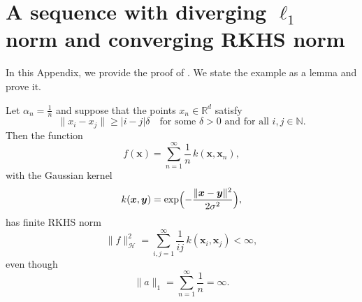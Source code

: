 \section{A sequence with diverging $\ell_1$ norm and converging RKHS norm}\label{app: diverging}
In this Appendix, we provide the proof of . We state the example as a lemma and prove it.

\begin{lemma}
Let $\alpha_n = \frac{1}{n}$ and suppose that the points $x_n \in \mathbb{R}^d$ satisfy 
\[
\|x_i-x_j\| \ge |i-j|\delta \quad \text{for some } \delta>0 \text{ and for all } i,j \in \mathbb{N}.
\]
Then the function
\[
f(\bm{x})=\sum_{n=1}^\infty \frac{1}{n}\, k(\bm{x},\bm{x}_n),
\]
with the Gaussian kernel 
\[
k(\bm{x},\bm{y})=\exp\Bigl(-\frac{\|\bm{x}-\bm{y}\|^2}{2\sigma^2}\Bigr),
\]
has finite RKHS norm
\[
\|f\|_{\mathcal{H}}^2 = \sum_{i,j=1}^\infty \frac{1}{ij}\, k(\bm{x}_i,\bm{x}_j) < \infty,
\]
even though 
\[
\|a\|_1 = \sum_{n=1}^\infty \frac{1}{n} = \infty.
\]
\end{lemma}

